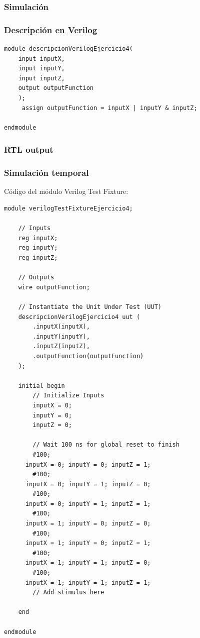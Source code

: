 \subsubsection{Simulación}
\subsubsection{Descripción en Verilog}
\begin{lstlisting}
module descripcionVerilogEjercicio4(
    input inputX,
    input inputY,
    input inputZ,
    output outputFunction
    );
	 assign outputFunction = inputX | inputY & inputZ;

endmodule
\end{lstlisting}
\subsubsection{RTL output}
\subsubsection{Simulación temporal}
\noindent Código del módulo Verilog Test Fixture:
\begin{lstlisting}
module verilogTestFixtureEjercicio4;

	// Inputs
	reg inputX;
	reg inputY;
	reg inputZ;

	// Outputs
	wire outputFunction;

	// Instantiate the Unit Under Test (UUT)
	descripcionVerilogEjercicio4 uut (
		.inputX(inputX), 
		.inputY(inputY), 
		.inputZ(inputZ), 
		.outputFunction(outputFunction)
	);

	initial begin
		// Initialize Inputs
		inputX = 0;
		inputY = 0;
		inputZ = 0;

		// Wait 100 ns for global reset to finish
		#100;
      inputX = 0; inputY = 0; inputZ = 1;
		#100;
      inputX = 0; inputY = 1; inputZ = 0;
		#100;
      inputX = 0; inputY = 1; inputZ = 1;
		#100;
      inputX = 1; inputY = 0; inputZ = 0;
		#100;
      inputX = 1; inputY = 0; inputZ = 1;
		#100;
      inputX = 1; inputY = 1; inputZ = 0;
		#100;
      inputX = 1; inputY = 1; inputZ = 1;		        
		// Add stimulus here

	end
      
endmodule
\end{lstlisting}

